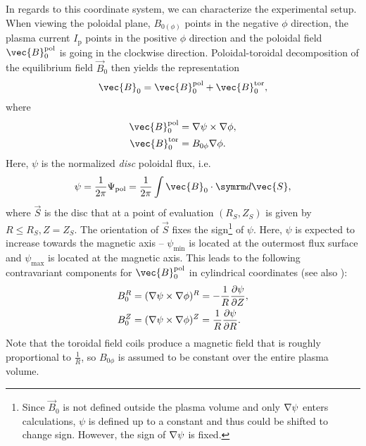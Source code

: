 In regards to this coordinate system, we can characterize the experimental setup. When viewing the poloidal plane, $B_{0 (\phi)}$ points in the negative $\phi$ direction, the plasma current $I_{\text{p}}$ points in the positive $\phi$ direction and the poloidal field $\vec{B}_{0}^{\pol}$ is going in the clockwise direction. Poloidal-toroidal decomposition of the equilibrium field $\vec{B}_{0}$ then yields the representation
\begin{gather}
  \vec{B}_{0} = \vec{B}_{0}^{\pol} + \vec{B}_{0}^{\tor}, \label{eq:B_pol_tor}
\end{gather}
where 
\begin{align}
  \vec{B}_{0}^{\pol} &= \grad \psi \times \grad \phi, \label{eq:B_pol} \\
  \vec{B}_{0}^{\tor} &= B_{0 \phi} \grad \phi. \label{eq:B_tor}
\end{align}
Here, $\psi$ is the normalized \emph{disc} poloidal flux, i.e.
\begin{gather}
  \psi = \frac{1}{2 \pi} \Psi_{\pol} = \frac{1}{2 \pi} \int \vec{B}_{0} \cdot \diff \vec{S},
\end{gather}
where $\vec{S}$ is the disc that at a point of evaluation $(R_{S}, Z_{S})$ is given by $R \leq R_{S}, Z = Z_{S}$. The orientation of $\vec{S}$ fixes the sign\footnote{Since $\vec{B}_{0}$ is not defined outside the plasma volume and only $\nabla \psi$ enters calculations, $\psi$ is defined up to a constant and thus could be shifted to change sign. However, the sign of $\nabla \psi$ is fixed.} of $\psi$. Here, $\psi$ is expected to increase towards the magnetic axis -- $\psi_{\text{min}}$ is located at the outermost flux surface and $\psi_{\text{max}}$ is located at the magnetic axis. This leads to the following contravariant components for $\vec{B}_{0}^{\pol}$ in cylindrical coordinates (see also \cite{Sauter13}):
\begin{align}
  B_{0}^{R} &= (\grad \psi \times \grad \phi)^{R} = -\frac{1}{R} \pd[\psi]{Z}, \label{eq:B0R} \\
  B_{0}^{Z} &= (\grad \psi \times \grad \phi)^{Z} = \frac{1}{R} \pd[\psi]{R}. \label{eq:B0Z}
\end{align}
Note that the toroidal field coils produce a magnetic field that is roughly proportional to $\frac{1}{R}$, so $B_{0 \phi}$ is assumed to be constant over the entire plasma volume.

